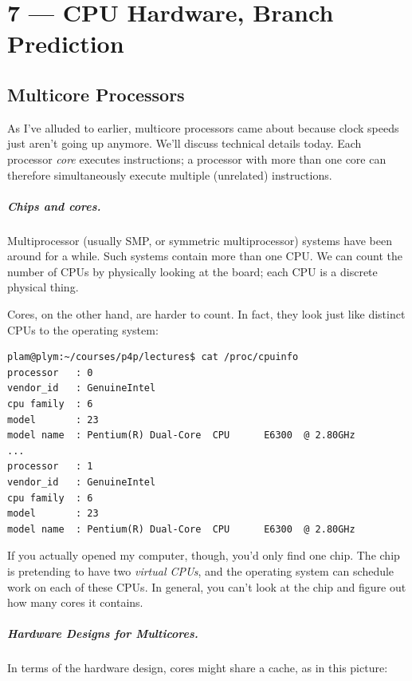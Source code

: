 \documentclass[a4paper]{report}
\begin{document}
\chapter*{7 --- CPU Hardware, Branch Prediction}


\section*{Multicore Processors}
As I've alluded to earlier, multicore processors came about because
clock speeds just aren't going up anymore. We'll discuss technical
details today. Each processor \emph{core} executes instructions; a processor with more than one core can therefore simultaneously execute multiple
(unrelated) instructions. 

\paragraph{Chips and cores.} Multiprocessor (usually SMP, or symmetric
multiprocessor) systems have been around for a while. Such systems
contain more than one CPU. We can count the number of CPUs by
physically looking at the board; each CPU is a discrete physical thing.

Cores, on the other hand, are harder to count. In fact, they look just
like distinct CPUs to the operating system:

{\scriptsize \begin{verbatim}
plam@plym:~/courses/p4p/lectures$ cat /proc/cpuinfo
processor	: 0
vendor_id	: GenuineIntel
cpu family	: 6
model		: 23
model name	: Pentium(R) Dual-Core  CPU      E6300  @ 2.80GHz
...
processor	: 1
vendor_id	: GenuineIntel
cpu family	: 6
model		: 23
model name	: Pentium(R) Dual-Core  CPU      E6300  @ 2.80GHz
\end{verbatim}
}
\vspace*{-1em}
If you actually opened my computer, though, you'd only find one chip.
The chip is pretending to have two \emph{virtual CPUs}, and the
operating system can schedule work on each of these CPUs. In general,
you can't look at the chip and figure out how many cores it contains.

\vspace*{-1em}
\paragraph{Hardware Designs for Multicores.}
In terms of the hardware design, cores might share a cache, as in this picture:
\end{document}
